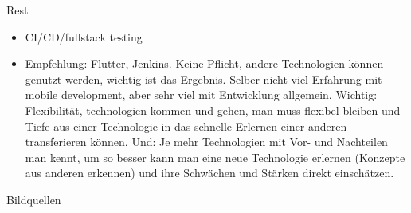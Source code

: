 \documentclass[aspectratio=169,t]{beamer}
\begin{document}
\begin{frame}{Rest}
 \begin{itemize}
    \item CI/CD/fullstack testing
    \item Empfehlung: Flutter, Jenkins. Keine Pflicht, andere Technologien können genutzt werden, wichtig ist das Ergebnis. Selber nicht viel Erfahrung mit mobile development, aber sehr viel mit Entwicklung allgemein. Wichtig: Flexibilität, technologien kommen und gehen, man muss flexibel bleiben und Tiefe aus einer Technologie in das schnelle Erlernen einer anderen transferieren können. Und: Je mehr Technologien mit Vor- und Nachteilen man kennt, um so besser kann man eine neue Technologie erlernen (Konzepte aus anderen erkennen) und ihre Schwächen und Stärken direkt einschätzen.
 \end{itemize}
    
\end{frame}

\begin{frame}{Bildquellen}
\printbibliography
\end{frame}
\end{document}
